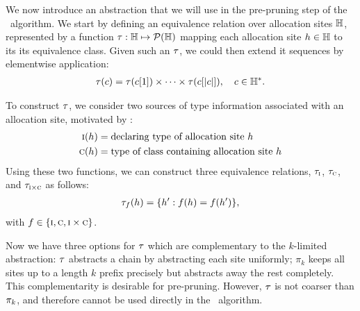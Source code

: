 We now introduce an abstraction that we will use in the pre-pruning step of the \PR\ algorithm.
We start by defining an equivalence relation over allocation sites ${\mathbb H}$,
represented by a function $\tau : {\mathbb H} \mapsto \mathcal{P}({\mathbb H})$
mapping each allocation site $h \in {\mathbb H}$ to its its equivalence class.
Given such an $\tau$, we could then extend it sequences by elementwise application:
\begin{align}
\tau(c) = \tau(c[1]) \times \cdots \times \tau(c[|c|]), \quad c \in {\mathbb H}^*.
\end{align}

To construct $\tau$, we consider two sources of type information associated
with an allocation site, motivated by \cite{smaragdakis11context}:
\begin{align}
\text{\sc i}(h)  &= \text{declaring type of allocation site $h$} \label{eqn:typeIs} \\
\text{\sc c}(h) &= \text{type of class containing allocation site $h$} \label{eqn:typeHas}
\end{align}
Using these two functions, we can construct three equivalence relations,
$\tau_{\text{\sc i}}$, $\tau_{\text{\sc c}}$, and $\tau_{\text{\sc i} \times \text{\sc c}}$ as follows:
\begin{align}
\tau_f(h) = \{ h' : f(h) = f(h') \}, \label{eqn:hclass}
\end{align}
with $f \in \{ \text{\sc i}, \text{\sc c}, \text{\sc i} \times \text{\sc c} \}$.

Now we have three options for $\tau$ which are complementary to the
$k$-limited abstraction: $\tau$ abstracts a chain by abstracting each site
uniformly; $\pi_k$ keeps all sites up to a length $k$ prefix precisely but
abstracts away the rest completely.  This complementarity is desirable
for pre-pruning.
However, $\tau$ is not coarser than $\pi_k$, and therefore cannot
be used directly in the \PR\ algorithm.

